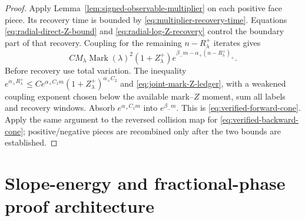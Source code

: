 \documentclass[11pt]{article}
\begin{document}
\begin{proof}
Apply Lemma~\ref{lem:signed-observable-multiplier} on each positive face
piece.  Its recovery time is bounded by
\eqref{eq:multiplier-recovery-time}.  Equations
\eqref{eq:radial-direct-Z-bound} and
\eqref{eq:radial-log-Z-recovery} control the boundary part of that recovery.
Coupling for the remaining
$n-R^+_\lambda$ iterates gives
\[
 CM_\lambda\operatorname{Mark}(\lambda)^2(1+Z_\lambda^+)
 e^{\beta_-m-\alpha_+(n-R^+_\lambda)_+}.
\]
Before recovery use total variation.  The inequality
 $e^{\alpha_+R^+_\lambda}\le
 Ce^{\alpha_+C_1m}(1+Z_\lambda^+)^{\alpha_+C_2}$ and
\eqref{eq:joint-mark-Z-ledger}, with a weakened coupling exponent chosen below
the available mark--$Z$ moment, sum all labels and recovery windows.  Absorb
$e^{\alpha_+C_1m}$ into $e^{\beta_-m}$.  This is
\eqref{eq:verified-forward-cone}.  Apply the same argument to the reversed
collision map for \eqref{eq:verified-backward-cone}; positive/negative pieces
are recombined only after the two bounds are established.
\end{proof}

\section{Slope-energy and fractional-phase proof architecture}
\end{document}
